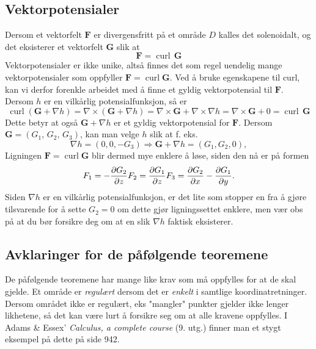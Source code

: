 \documentclass[fleqn,12pt]{wlscirep}
\begin{document}
\subsection{Vektorpotensialer}
Dersom et vektorfelt $\textbf{F}$ er divergensfritt på et område $D$ kalles det solenoidalt, og det eksisterer et vektorfelt \textbf{G} slik at 
\begin{equation}
    \textbf{F} = \operatorname{curl}\,\textbf{G}
\end{equation}
Vektorpotensialer er ikke unike, altså finnes det som regel uendelig mange vektorpotensialer som oppfyller $\textbf{F} = \operatorname{curl} \textbf{G}$. Ved å bruke egenskapene til curl, kan vi derfor forenkle arbeidet med å finne et gyldig vektorpotensial til $\textbf{F}$. \newline Dersom $h$ er en vilkårlig potensialfunksjon, så er
\begin{equation}
    \operatorname{curl}(\textbf{G} + \nabla h) = \nabla \times (\textbf{G} +\nabla h) = \nabla \times \textbf{G} + \nabla \times \nabla h = \nabla \times \textbf{G} + 0 = \operatorname{curl} \, \textbf{G} 
\end{equation}
Dette betyr at også $\textbf{G} + \nabla h$ er et gyldig vektorpotensial for $\textbf{F}$. Dersom $\textbf{G}=(G_1,\, G_2, \, G_3)$, kan man velge $h$ slik at f. eks. \begin{equation}
    \nabla h = (0,0,-G_3) \Longrightarrow \textbf{G} + \nabla h = (G_1, G_2, 0),
\end{equation}
Ligningen $\textbf{F} = \operatorname{curl} \textbf{G}$ blir dermed mye enklere å løse, siden den nå er på formen
\begin{equation}
    F_1 = -\frac{\partial G_2}{\partial z}\\
    F_2 = \frac{\partial G_1}{\partial z}\\
    F_3 = \frac{\partial G_2}{\partial x} - \frac{\partial G_1}{\partial y}.
\end{equation}
Siden $\nabla h$ er en vilkårlig potensialfunksjon, er det lite som stopper en fra å gjøre tilsvarende for å sette $G_2 = 0$ om dette gjør ligningssettet enklere, men vær obs på at du bør forsikre deg om at en slik $\nabla h$ faktisk eksisterer.
\subsection{Avklaringer for de påfølgende teoremene}
De påfølgende teoremene har mange like krav som må oppfylles for at de skal gjelde.  Et område er \textit{regulært} dersom det er \textit{enkelt} i samtlige koordinatretninger. Dersom området ikke er regulært, eks "mangler" punkter gjelder ikke lenger likhetene, så det kan være lurt å forsikre seg om at alle kravene oppfylles. I Adams \& Essex' \textit{Calculus, a complete course} (9. utg.) finner man et stygt eksempel på dette på side 942.
\end{document}
